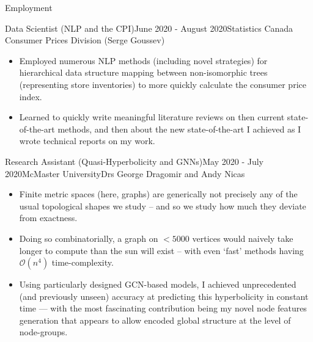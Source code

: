 \begin{rSection}{Employment}
\begin{rSubsection}{Data Scientist (NLP and the CPI)}{June 2020 - August 2020}{Statistics Canada }{Consumer Prices Division (Serge Goussev)}
    \begin{itemize}
      \addtolength\itemsep{-0.5em}
      \item Employed numerous NLP methods (including novel strategies) for hierarchical data structure mapping between non-isomorphic trees (representing store inventories) to more quickly calculate the consumer price index.
      \item Learned to quickly write meaningful literature reviews on then current state-of-the-art methods, and then about the new state-of-the-art I achieved as I wrote technical reports on  my work.
    \end{itemize}
\end{rSubsection}


\begin{rSubsection}{Research Assistant (Quasi-Hyperbolicity and GNNs)}{May 2020 - July 2020}{McMaster University}{Drs George Dragomir and Andy Nicas}
    \begin{itemize}
      \addtolength\itemsep{-0.5em}
       \item Finite metric spaces (here, graphs) are generically not precisely any of the usual topological shapes we study -- and so we study how much they deviate from exactness.
       \item Doing so combinatorially, a graph on $<5000$ vertices would naively take longer to compute than the sun will exist -- with even `fast' methods having $\mathcal{O}(n^4)$ time-complexity.
      \item Using particularly designed GCN-based models, I achieved unprecedented (and previously unseen) accuracy at predicting this hyperbolicity in constant time --- with the most fascinating contribution being my novel node features generation that appears to allow encoded global structure at the level of node-groups.
    \end{itemize}
\end{rSubsection}



\end{rSection}
